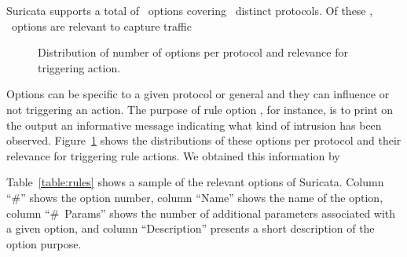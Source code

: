 \documentclass[runningheads]{llncs}
\begin{document}
Suricata supports a total of \totoptions\ options covering
\numproto\ distinct protocols. Of these \totoptions,
\totoptionsrelevant\ options are relevant to capture traffic
\begin{figure}
  \centering
  \vspace{-4ex}
  \caption{\label{fig:distribution-rules-protocol}Distribution of
    number of options per protocol and relevance for triggering action.}
\end{figure}
Options can be specific
to a given protocol or general and they can influence or not
triggering an action. The purpose of rule option , for
instance, is to print on the output an informative message indicating
what kind of intrusion has been
observed. Figure~\ref{fig:distribution-rules-protocol} shows the
distributions of these options per protocol and their relevance for
triggering rule actions. We obtained this information
by 





Table~\ref{table:rules}
shows a sample of the relevant options of Suricata. Column ``\#''
shows the option number, column ``Name'' shows the name of the
option, column ``\#~Params'' shows the number of additional parameters
associated with a given option, and column ``Description'' presents a
short description of the option purpose. 
\end{document}
